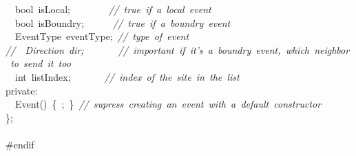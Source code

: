 {\ \ bool\ isLocal;\ \ \ \ \ \ \ \ \textsl{//\ true\ if\ a\ local\ event}\\
\ \ bool\ isBoundry;\ \ \ \ \ \ \textsl{//\ true\ if\ a\ boundry\ event}\\
\ \ EventType\ eventType;\ \textsl{//\ type\ of\ event}\\
\textsl{//\ \ Direction\ dir;\ \ \ \ \ \ \ //\ important\ if\ it's\ a\ boundry\ event,\ which\ neighbor\ to\ send\ it\ too}\\
\ \ int\ listIndex;\ \ \ \ \ \ \ \textsl{//\ index\ of\ the\ site\ in\ the\ list}\\
private:\\
\ \ Event()\ \{\ ;\ \}\ \textsl{//\ supress\ creating\ an\ event\ with\ a\ default\ constructor}\\
\};\\
\ \\
\#endif\\
\ \\
\ \\
\ \\
 }
\normalfont\normalsize

